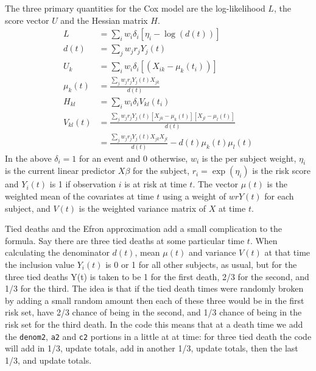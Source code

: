 \documentclass{article}
\newcommand{\code}[1]{\texttt{#1}}
\begin{document}
The three primary quantities for the Cox model are the log-likelihood $L$,
the score vector $U$ and the Hessian matrix $H$.
\begin{align*}
  L &=  \sum_i w_i \delta_i \left[\eta_i - \log(d(t)) \right] \\
  d(t) &= \sum_j w_j r_j Y_j(t) \\
  U_k  &= \sum_i w_i \delta_i \left[ (X_{ik} - \mu_k(t_i)) \right] \\
  \mu_k(t) &= \frac{\sum_j w_j r_j Y_j(t) X_{jk}} {d(t)} \\
  H_{kl}  &= \sum_i w_i \delta_i V_{kl}(t_i) \\
  V_{kl}(t) &= \frac{\sum_j w_j r_j Y_j(t) [X_{jk} - \mu_k(t)]
     [X_{jl}- \mu_l(t)]} {d(t)} \\
            &= \frac{\sum_j w_j r_j Y_j(t) X_{jk}X_{jl}} {d(t)}
                  - d(t) \mu_k(t) \mu_l(t) 
\end{align*}
In the above $\delta_i =1$ for an event and 0 otherwise, $w_i$ is the per
subject weight, $\eta_i$ is the current linear predictor $X\beta$ for the
subject, $r_i = \exp(\eta_i)$ is the risk score
and $Y_i(t)$ is 1 if observation $i$ is at risk at time $t$.
The vector $\mu(t)$ is the weighted mean of the covariates at time $t$
using a weight of $w r Y(t)$ for each subject, and $V(t)$ is the weighted
variance matrix of $X$ at time $t$.

Tied deaths and the Efron approximation add a small complication to the
formula.  Say there are three tied deaths at some particular time $t$.
When calculating the denominator $d(t)$, mean $\mu(t)$ and variance
$V(t)$ at that time the inclusion value $Y_i(t)$ is 0 or 1 for all other
subjects, as usual, but for the three tied deaths Y(t) is taken to
be 1 for the first death, 2/3 for the second, and 1/3 for the third.
The idea is that if the tied death times were randomly broken by adding
a small random amount then each of these three would be in the first risk set,
have 2/3 chance of being in the second, and 1/3 chance of being in the risk
set for the third death.  
In the code this means that at a death time we add the \code{denom2},
\code{a2} and \code{c2} portions in a little at at time:
for three tied death the code will add in 1/3, update totals,
add in another 1/3, update totals, then the last 1/3, and update totals.
\end{document}
